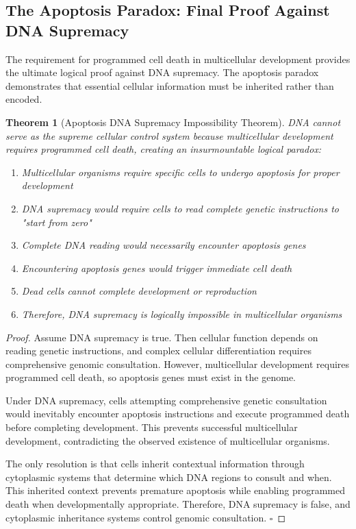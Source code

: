 \documentclass[12pt,a4paper]{article}
\newtheorem{theorem}{Theorem}[section]
\begin{document}
\subsection{The Apoptosis Paradox: Final Proof Against DNA Supremacy}

The requirement for programmed cell death in multicellular development provides the ultimate logical proof against DNA supremacy. The apoptosis paradox demonstrates that essential cellular information must be inherited rather than encoded.

\begin{theorem}[Apoptosis DNA Supremacy Impossibility Theorem]
DNA cannot serve as the supreme cellular control system because multicellular development requires programmed cell death, creating an insurmountable logical paradox:
\begin{enumerate}
\item Multicellular organisms require specific cells to undergo apoptosis for proper development
\item DNA supremacy would require cells to read complete genetic instructions to "start from zero"
\item Complete DNA reading would necessarily encounter apoptosis genes
\item Encountering apoptosis genes would trigger immediate cell death
\item Dead cells cannot complete development or reproduction
\item Therefore, DNA supremacy is logically impossible in multicellular organisms
\end{enumerate}
\end{theorem}

\begin{proof}
Assume DNA supremacy is true. Then cellular function depends on reading genetic instructions, and complex cellular differentiation requires comprehensive genomic consultation. However, multicellular development requires programmed cell death, so apoptosis genes must exist in the genome.

Under DNA supremacy, cells attempting comprehensive genetic consultation would inevitably encounter apoptosis instructions and execute programmed death before completing development. This prevents successful multicellular development, contradicting the observed existence of multicellular organisms.

The only resolution is that cells inherit contextual information through cytoplasmic systems that determine which DNA regions to consult and when. This inherited context prevents premature apoptosis while enabling programmed death when developmentally appropriate. Therefore, DNA supremacy is false, and cytoplasmic inheritance systems control genomic consultation. $\square$
\end{proof}
\end{document}
